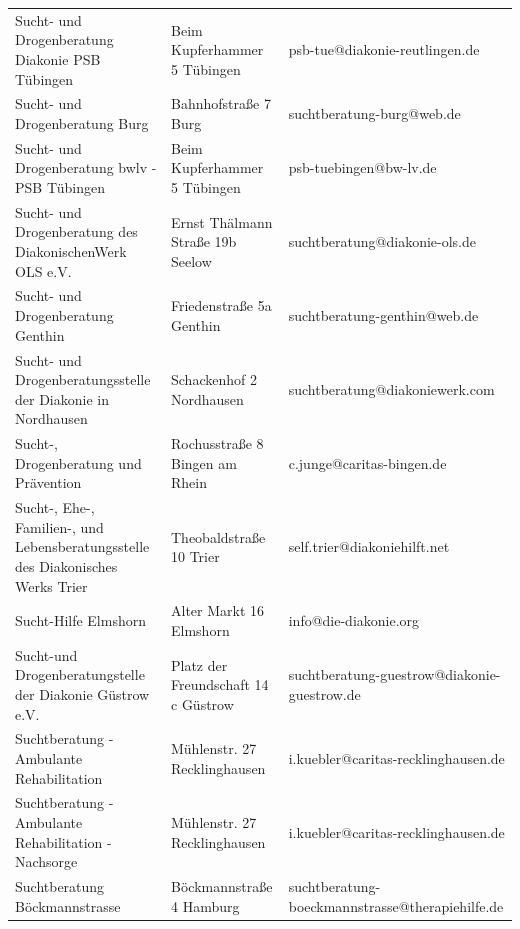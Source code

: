 {\begin{xltabular}{\textwidth} {
 >{\raggedright\arraybackslash}p{5cm}
 >{\raggedright\arraybackslash}X
 >{\raggedright\arraybackslash}p{5cm} }
Sucht- und Drogenberatung Diakonie PSB Tübingen & Beim Kupferhammer 5 Tübingen & psb-tue@diakonie-reutlingen.de \\
Sucht- und Drogenberatung Burg & Bahnhofstraße 7 Burg & suchtberatung-burg@web.de \\
Sucht- und Drogenberatung bwlv - PSB Tübingen & Beim Kupferhammer 5 Tübingen & psb-tuebingen@bw-lv.de \\
Sucht- und Drogenberatung des DiakonischenWerk OLS e.V. & Ernst Thälmann Straße 19b Seelow & suchtberatung@diakonie-ols.de \\
Sucht- und Drogenberatung Genthin & Friedenstraße 5a Genthin & suchtberatung-genthin@web.de \\
Sucht- und Drogenberatungsstelle der Diakonie in Nordhausen & Schackenhof 2 Nordhausen & suchtberatung@diakoniewerk.com \\
Sucht-, Drogenberatung und Prävention & Rochusstraße 8 Bingen am Rhein & c.junge@caritas-bingen.de \\
Sucht-, Ehe-, Familien-, und Lebensberatungsstelle des Diakonisches Werks Trier & Theobaldstraße 10 Trier & self.trier@diakoniehilft.net \\
Sucht-Hilfe Elmshorn & Alter Markt 16 Elmshorn & info@die-diakonie.org \\
Sucht-und Drogenberatungstelle der Diakonie Güstrow e.V. & Platz der Freundschaft 14 c Güstrow & suchtberatung-guestrow@diakonie-guestrow.de \\
Suchtberatung - Ambulante Rehabilitation & Mühlenstr. 27 Recklinghausen & i.kuebler@caritas-recklinghausen.de \\
Suchtberatung - Ambulante Rehabilitation - Nachsorge & Mühlenstr. 27 Recklinghausen & i.kuebler@caritas-recklinghausen.de \\
Suchtberatung Böckmannstrasse & Böckmannstraße 4 Hamburg & suchtberatung-boeckmannstrasse@therapiehilfe.de \\

\end{xltabular}}
